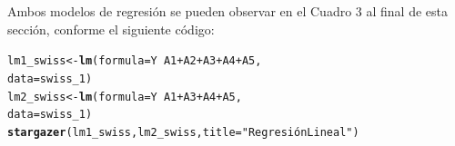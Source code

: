 \documentclass[10pt,a4paper]{article}\usepackage[]{graphicx}\usepackage[]{color}
\makeatletter
\newcommand{\hlstr}[1]{\textcolor[rgb]{0.192,0.494,0.8}{#1}}%
\newcommand{\hlopt}[1]{\textcolor[rgb]{0,0,0}{#1}}%
\newcommand{\hlstd}[1]{\textcolor[rgb]{0.345,0.345,0.345}{#1}}%
\newcommand{\hlkwb}[1]{\textcolor[rgb]{0.69,0.353,0.396}{#1}}%
\newcommand{\hlkwc}[1]{\textcolor[rgb]{0.333,0.667,0.333}{#1}}%
\newcommand{\hlkwd}[1]{\textcolor[rgb]{0.737,0.353,0.396}{\textbf{#1}}}%
\newenvironment{kframe}{%
 \def\at@end@of@kframe{}%
 \ifinner\ifhmode%
  \def\at@end@of@kframe{\end{minipage}}%
  \begin{minipage}{\columnwidth}%
 \fi\fi%
 \def\FrameCommand##1{\hskip\@totalleftmargin \hskip-\fboxsep
 \colorbox{shadecolor}{##1}\hskip-\fboxsep
     \hskip-\linewidth \hskip-\@totalleftmargin \hskip\columnwidth}%
 \MakeFramed {\advance\hsize-\width
   \@totalleftmargin\z@ \linewidth\hsize
   \@setminipage}}%
 {\par\unskip\endMakeFramed%
 \at@end@of@kframe}
\makeatother
\begin{document}
Ambos modelos de regresión se pueden observar en el Cuadro 3 al final de esta sección, conforme el siguiente código:

\begin{kframe}
\begin{alltt}
\hlstd{lm1_swiss} \hlkwb{<-} \hlkwd{lm}\hlstd{(}\hlkwc{formula} \hlstd{= Y} \hlopt{~} \hlstd{A1}\hlopt{+}\hlstd{A2}\hlopt{+}\hlstd{A3}\hlopt{+}\hlstd{A4}\hlopt{+}\hlstd{A5,}
\hlkwc{data}\hlstd{=swiss_1)}
\hlstd{lm2_swiss} \hlkwb{<-} \hlkwd{lm}\hlstd{(}\hlkwc{formula} \hlstd{= Y} \hlopt{~} \hlstd{A1}\hlopt{+}\hlstd{A3}\hlopt{+}\hlstd{A4}\hlopt{+}\hlstd{A5,}
\hlkwc{data}\hlstd{=swiss_1)}
\hlkwd{stargazer}\hlstd{(lm1_swiss,lm2_swiss,} \hlkwc{title}\hlstd{=}\hlstr{"Regresión Lineal"}\hlstd{)}
\end{alltt}
\end{kframe}
\end{document}
